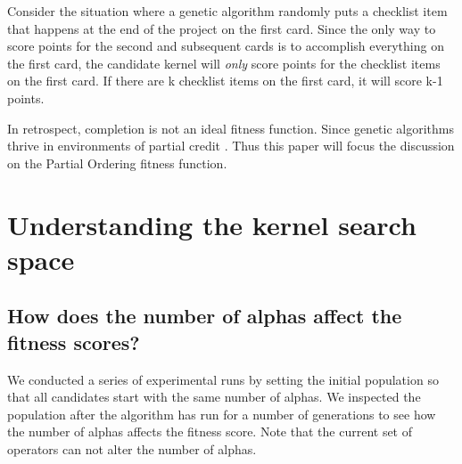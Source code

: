 \documentclass[preprint,12pt,3p]{elsarticle}
\begin{document}
Consider the situation where a genetic algorithm randomly puts a checklist item that happens at the end of the project on the first card. Since the only way to score points for the second and subsequent cards is to accomplish everything on the first card, the candidate kernel will \textit{only} score points for the checklist items on the first card. If there are k checklist items on the first card, it will score k-1 points.

In retrospect, completion is not an ideal fitness function. Since genetic algorithms thrive in environments of partial credit \cite{Eiben2003}. Thus this paper will focus the discussion on the Partial Ordering fitness function.

\section{Understanding the kernel search space}


\subsection{How does the number of alphas affect the fitness scores?}
We conducted a series of experimental runs by setting the initial population so that all candidates start with the same number of alphas. We inspected the population after the algorithm has run for a number of generations to see how the number of alphas affects the fitness score. Note that the current set of operators can not alter the number of alphas.
\end{document}
